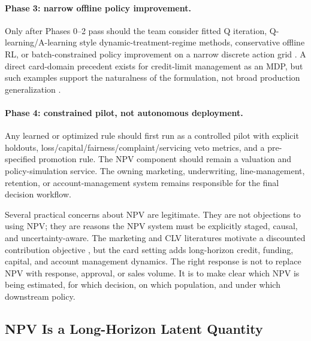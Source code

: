 \documentclass[11pt]{article}
\newcommand{\1}{\mathbf{1}}
\begin{document}
\paragraph{Phase 3: narrow offline policy improvement.}
Only after Phases 0--2 pass should the team consider fitted Q iteration,
Q-learning/A-learning style dynamic-treatment-regime methods, conservative
offline RL, or batch-constrained policy improvement on a narrow discrete action
grid \citep{ernst2005fqi,schulte2014qlearning,laroche2019spibb,
fujimoto2019bcq,kumar2020cql}. A direct card-domain precedent exists for
credit-limit management as an MDP, but such examples support the naturalness of
the formulation, not broad production generalization
\citep{trench2003bankone,alfonsosanchez2024creditlimit}.

\paragraph{Phase 4: constrained pilot, not autonomous deployment.}
Any learned or optimized rule should first run as a controlled pilot with
explicit holdouts, loss/capital/fairness/complaint/servicing veto metrics, and a
pre-specified promotion rule. The NPV component should remain a valuation and
policy-simulation service. The owning marketing, underwriting, line-management,
retention, or account-management system remains responsible for the final
decision workflow.


Several practical concerns about NPV are legitimate. They are not objections to
using NPV; they are reasons the NPV system must be explicitly staged, causal,
and uncertainty-aware. The marketing and CLV literatures motivate a discounted
contribution objective \citep{bult1995directmail,berger1998clv,rust2004return,venkatesan2004clv},
but the card setting adds long-horizon credit, funding, capital, and account
management dynamics. The right response is not to replace NPV with response,
approval, or sales volume. It is to make clear which NPV is being estimated, for
which decision, on which population, and under which downstream policy.

\subsection{NPV Is a Long-Horizon Latent Quantity}
\label{subsec:npv-latent}
\end{document}
